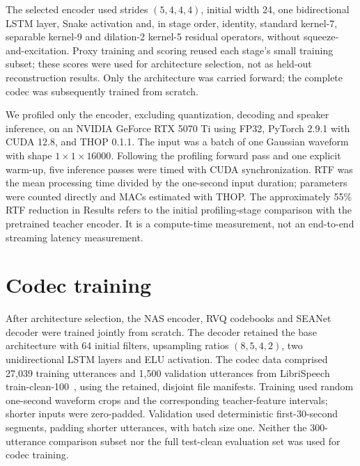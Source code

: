 The selected encoder used strides $(5,4,4,4)$, initial width 24, one bidirectional LSTM layer, Snake activation and, in stage order, identity, standard kernel-7, separable kernel-9 and dilation-2 kernel-5 residual operators, without squeeze-and-excitation. Proxy training and scoring reused each stage's small training subset; these scores were used for architecture selection, not as held-out reconstruction results. Only the architecture was carried forward; the complete codec was subsequently trained from scratch.

We profiled only the encoder, excluding quantization, decoding and speaker inference, on an NVIDIA GeForce RTX 5070 Ti using FP32, PyTorch 2.9.1 with CUDA 12.8, and THOP 0.1.1. The input was a batch of one Gaussian waveform with shape $1\times1\times16000$. Following the profiling forward pass and one explicit warm-up, five inference passes were timed with CUDA synchronization. RTF was the mean processing time divided by the one-second input duration; parameters were counted directly and MACs estimated with THOP. The approximately 55\% RTF reduction in Results refers to the initial profiling-stage comparison with the pretrained teacher encoder. It is a compute-time measurement, not an end-to-end streaming latency measurement.

\section{Codec training}
After architecture selection, the NAS encoder, RVQ codebooks and SEANet decoder were trained jointly from scratch. The decoder retained the base architecture with 64 initial filters, upsampling ratios $(8,5,4,2)$, two unidirectional LSTM layers and ELU activation. The codec data comprised 27,039 training utterances and 1,500 validation utterances from LibriSpeech train-clean-100~\cite{librispeech}, using the retained, disjoint file manifests. Training used random one-second waveform crops and the corresponding teacher-feature intervals; shorter inputs were zero-padded. Validation used deterministic first-30-second segments, padding shorter utterances, with batch size one. Neither the 300-utterance comparison subset nor the full test-clean evaluation set was used for codec training.

